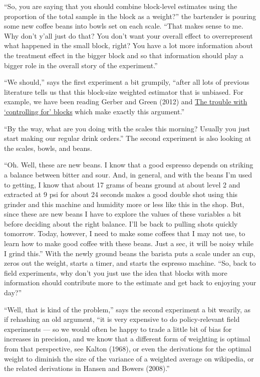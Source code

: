 \documentclass[
]{article}
\begin{document}
``So, you are saying that you should combine block-level estimates using the
proportion of the total sample in the block as a weight?'' the bartender is
pouring some new coffee beans into bowls set on each scale. ``That makes sense
to me. Why don't y'all just do that? You don't want your overall effect to
overrepresent what happened in the small block, right? You have a lot more
information about the treatment effect in the bigger block and so that
information should play a bigger role in the overall story of the experiment.''

``We should,'' says the first experiment a bit grumpily, ``after all lots of previous literature tells us that this block-size weighted estimator that is unbiased. For example, we have been reading Gerber and Green (2012) and \href{https://declaredesign.org/blog/biased-fixed-effects.html}{The trouble with `controlling for' blocks} which make exactly this argument.''

``By the way, what are you doing with the scales this morning? Usually you just start making our regular drink orders.'' The second experiment is also looking at the scales, bowls, and beans.

``Oh. Well, these are new beans. I know that a good espresso depends on striking a balance between bitter and sour. And, in general, and with the beans I'm used to getting, I know that about 17 grams of beans ground at about level 2 and extracted at 9 psi for about 24 seconds makes a good double shot using this grinder and this machine and humidity more or less like this in the shop. But, since these are new beans I have to explore the values of these variables a bit before deciding about the right balance. I'll be back to pulling shots quickly tomorrow. Today, however, I need to make some coffees that I may not use, to learn how to make good coffee with these beans. Just a sec, it will be noisy while I grind this.'' With the newly ground beans the barista puts a scale under an cup, zeros out the weight, starts a timer, and starts the espresso machine. ``So, back to field experiments, why don't you just use the idea that blocks with more information should contribute more to the estimate and get back to enjoying your day?''

``Well, that is kind of the problem,'' says the second experiment a bit wearily, as if rehashing an old argument, ``it is very expensive to do policy-relevant field experiments --- so we would often be happy to trade a little bit of bias for increases in precision, and we know that a different form of weighting is optimal from that perspective, see Kalton (1968), or even the derivations for the optimal weight to diminish the size of the variance of a weighted average on wikipedia, or the related derivations in Hansen and Bowers (2008).''
\end{document}
